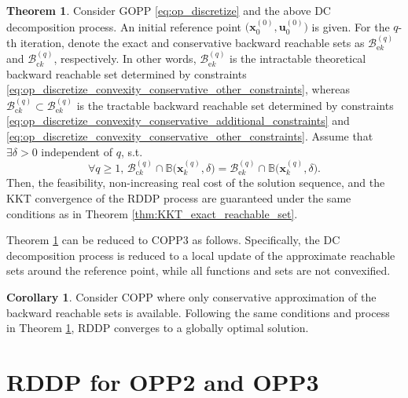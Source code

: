 \documentclass[journal]{IEEEtran}
\theoremstyle{definition}
\newtheorem{theorem}{Theorem}
\newtheorem{corollary}{Corollary}
\theoremstyle{definition}
\renewcommand\vector[1]{\boldsymbol{#1}}
\newcommand\vx{{\vector{x}}}
\newcommand\bx{{\mathbf{x}}}
\newcommand\bu{{\mathbf{u}}}
\begin{document}
\begin{theorem}\label{thm:KKT_approximate_reachable_set}
    Consider GOPP \eqref{eq:op_discretize} and the above DC decomposition process. An initial reference point $\Big(\bx_0^{(0)},\bu_0^{(0)}\Big)$ is given. For the $q$-th iteration, denote the exact and conservative backward reachable sets as $\mathcal{B}_{\text{e}k}^{(q)}$ and $\mathcal{B}_{\text{c}k}^{(q)}$, respectively. In other words, $\mathcal{B}_{\text{e}k}^{(q)}$ is the intractable theoretical backward reachable set determined by constraints \eqref{eq:op_discretize_convexity_conservative_other_constraints}, whereas $\mathcal{B}_{\text{c}k}^{(q)}\subset\mathcal{B}_{\text{e}k}^{(q)}$ is the tractable backward reachable set determined by constraints \eqref{eq:op_discretize_convexity_conservative_additional_constraints} and \eqref{eq:op_discretize_convexity_conservative_other_constraints}. Assume that $\exists \delta>0$ independent of $q$, s.t.
    \begin{equation}\label{eq:KKT_approximate_reachable_set_condition}
        \forall q\geq1,\,\mathcal{B}_{\text{c}k}^{(q)}\cap\mathbb{B}\Big(\vx_k^{(q)},\delta\Big)=\mathcal{B}_{\text{e}k}^{(q)}\cap\mathbb{B}\Big(\vx_k^{(q)},\delta\Big).
    \end{equation}
    Then, the feasibility, non-increasing real cost of the solution sequence, and the KKT convergence of the RDDP process are guaranteed under the same conditions as in Theorem \ref{thm:KKT_exact_reachable_set}.
\end{theorem}

Theorem \ref{thm:KKT_approximate_reachable_set} can be reduced to COPP3 as follows. Specifically, the DC decomposition process is reduced to a local update of the approximate reachable sets around the reference point, while all functions and sets are not convexified.

\begin{corollary}\label{cor:global_optimal_approximate_reachable_set}
    Consider COPP where only conservative approximation of the backward reachable sets is available. Following the same conditions and process in Theorem \ref{thm:KKT_approximate_reachable_set}, RDDP converges to a globally optimal solution.
\end{corollary}

\section{RDDP for OPP2 and OPP3}\label{sec:ardp_opp2_opp3}
\end{document}
